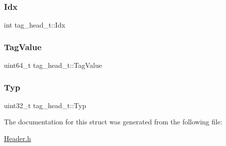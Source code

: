 \subsubsection{\texorpdfstring{Idx}{Idx}}
{\footnotesize\ttfamily int tag\+\_\+head\+\_\+t\+::\+Idx}

\mbox{\label{structtag__head__t_ac340e31698e1406e0fb4cc0e207b0925}} 
\subsubsection{\texorpdfstring{Tag\+Value}{TagValue}}
{\footnotesize\ttfamily uint64\+\_\+t tag\+\_\+head\+\_\+t\+::\+Tag\+Value}

\mbox{\label{structtag__head__t_ad3f52d70ea59814ad8acb60ebbe155e3}} 
\subsubsection{\texorpdfstring{Typ}{Typ}}
{\footnotesize\ttfamily uint32\+\_\+t tag\+\_\+head\+\_\+t\+::\+Typ}



The documentation for this struct was generated from the following file\+:\begin{DoxyCompactItemize}
\item 
\hyperlink{_header_8h}{Header.\+h}\end{DoxyCompactItemize}
